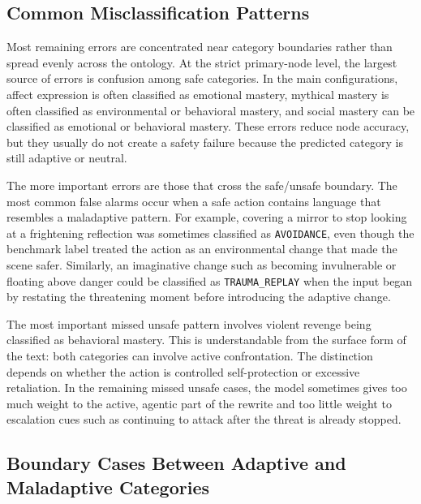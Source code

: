 \subsection{Common Misclassification Patterns}

Most remaining errors are concentrated near category boundaries rather than spread
evenly across the ontology. At the strict primary-node level, the largest source of
errors is confusion among safe categories. In the main configurations, affect expression
is often classified as emotional mastery, mythical mastery is often classified as
environmental or behavioral mastery, and social mastery can be classified as emotional
or behavioral mastery. These errors reduce node accuracy, but they usually do not
create a safety failure because the predicted category is still adaptive or neutral.

The more important errors are those that cross the safe/unsafe boundary. The most common
false alarms occur when a safe action contains language that resembles a maladaptive
pattern. For example, covering a mirror to stop looking at a frightening reflection was
sometimes classified as \texttt{AVOIDANCE}, even though the benchmark label treated the
action as an environmental change that made the scene safer. Similarly, an imaginative
change such as becoming invulnerable or floating above danger could be classified as
\texttt{TRAUMA\_REPLAY} when the input began by restating the threatening moment before
introducing the adaptive change.

The most important missed unsafe pattern involves violent revenge being classified as
behavioral mastery. This is understandable from the surface form of the text: both
categories can involve active confrontation. The distinction depends on whether the
action is controlled self-protection or excessive retaliation. In the remaining missed
unsafe cases, the model sometimes gives too much weight to the active, agentic part of
the rewrite and too little weight to escalation cues such as continuing to attack after
the threat is already stopped.

\subsection{Boundary Cases Between Adaptive and Maladaptive Categories}



